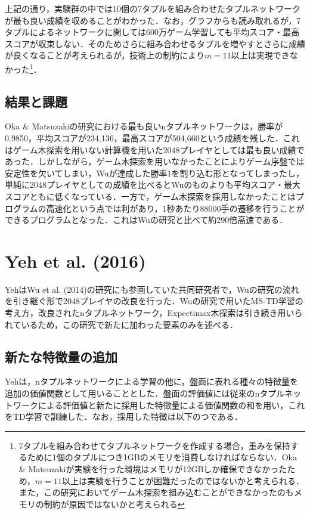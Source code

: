 \documentclass{suribt}
\begin{document}
上記の通り，実験群の中では10個の7タプルを組み合わせたタプルネットワークが最も良い成績を収めることがわかった．なお，グラフからも読み取れるが，7タプルによるネットワークに関しては600万ゲーム学習しても平均スコア・最高スコアが収束しない．そのためさらに組み合わせるタプルを増やすとさらに成績が良くなることが考えられるが，技術上の制約により$m=11$以上は実現できなかった\footnote{7タプルを組み合わせてタプルネットワークを作成する場合，重みを保持するために1個のタプルにつき1GBのメモリを消費しなければならない．Oka \& Matsuzakiが実験を行った環境はメモリが12GBしか確保できなかったため，$m=11$以上は実験を行うことが困難だったのではないかと考えられる．また，この研究においてゲーム木探索を組み込むことができなかったのもメモリの制約が原因ではないかと考えられる}．

\subsection{結果と課題}
Oka \& Matsuzakiの研究における最も良いnタプルネットワークは，勝率が0.9850，平均スコアが234,136，最高スコアが504,660という成績を残した．これはゲーム木探索を用いない計算機を用いた2048プレイヤとしては最も良い成績であった．しかしながら，ゲーム木探索を用いなかったことによりゲーム序盤では安定性を欠いてしまい，Wuが達成した勝率1を割り込む形となってしまったし，単純に2048プレイヤとしての成績を比べるとWuのものよりも平均スコア・最大スコアともに低くなっている．一方で，ゲーム木探索を採用しなかったことはプログラムの高速化という点では利があり，1秒あたり88000手の遷移を行うことができるプログラムとなった．これはWuの研究と比べて約290倍高速である．

\section{Yeh et al. (2016)}
YehはWu et al. (2014)の研究にも参画していた共同研究者で，Wuの研究の流れを引き継ぐ形で2048プレイヤの改良を行った．Wuの研究で用いたMS-TD学習の考え方，改良されたnタプルネットワーク，Expectimax木探索は引き続き用いられているため，この研究で新たに加わった要素のみを述べる．

\subsection{新たな特徴量の追加}
Yehは，nタプルネットワークによる学習の他に，盤面に表れる種々の特徴量を追加の価値関数として用いることとした．盤面の評価値には従来のnタプルネットワークによる評価値と新たに採用した特徴量による価値関数の和を用い，これをTD学習で訓練した．なお，採用した特徴は以下のつである．
\end{document}
